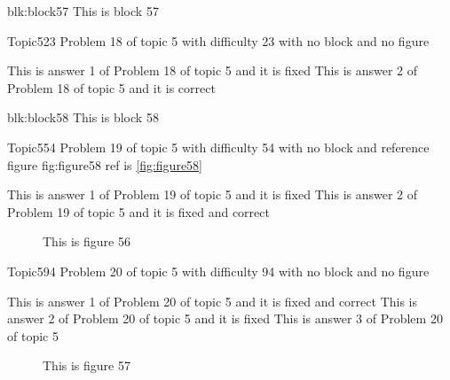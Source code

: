 \documentclass[master]{exam}
\begin{document}
\begin{block}{blk:block57}
This is block 57
\end{block}


\begin{problem}{Topic5}{23}
	Problem 18 of topic 5 with difficulty 23 with no block and no figure
	\begin{answers}
		\answer[fixed] This is answer 1 of Problem 18 of topic 5 and it is fixed
		\answer[correct] This is answer 2 of Problem 18 of topic 5 and it is correct
	\end{answers}
\end{problem}



\begin{block}{blk:block58}
This is block 58
\end{block}


\begin{problem}{Topic5}{54}
	Problem 19 of topic 5 with difficulty 54 with no block and reference figure fig:figure58 ref is \ref{fig:figure58}
	\begin{answers}
		\answer[fixed] This is answer 1 of Problem 19 of topic 5 and it is fixed
		 This is answer 2 of Problem 19 of topic 5 and it is fixed and correct
	\end{answers}
\end{problem}



\begin{figure}
	\begin{center}
		This is figure 56 
		\label{fig:figure56}
	\end{center}
\end{figure}

\begin{problem}{Topic5}{94}
	Problem 20 of topic 5 with difficulty 94 with no block and no figure
	\begin{answers}
		 This is answer 1 of Problem 20 of topic 5 and it is fixed and correct
		\answer[fixed] This is answer 2 of Problem 20 of topic 5 and it is fixed
		\answer This is answer 3 of Problem 20 of topic 5 
	\end{answers}
\end{problem}



\begin{figure}
	\begin{center}
		This is figure 57 
		\label{fig:figure57}
	\end{center}
\end{figure}
\end{document}
